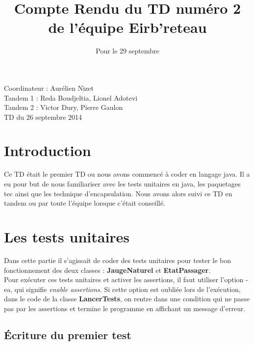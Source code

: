 \documentclass[a4paper,11pts]{article}
\begin{document}
\title{Compte Rendu du TD numéro 2 de l'équipe Eirb'reteau}
\date{Pour le 29 septembre}
\maketitle

\begin{center}
  Coordinateur : Aurélien Nizet\\
  Tandem 1 : Reda Boudjeltia, Lionel Adotevi\\
  Tandem 2 : Victor Dury, Pierre Gaulon\\
  TD du 26 septembre 2014
\end{center}
\maketitle

\section{Introduction}

Ce TD était le premier TD ou nous avons commencé à coder en langage java. Il a eu pour but de nous familiariser avec les tests unitaires en java, les paquetages tec ainsi que les technique d'encapsulation. Nous avons alors suivi ce TD en tandem ou par toute l'équipe lorsque c'était conseillé.

\section{Les tests unitaires}

Dans cette partie il s'agissait de coder des tests unitaires pour tester le bon fonctionnement des deux classes : \textbf{JaugeNaturel} et \textbf{EtatPassager}.
\\
Pour exécuter ces tests unitaires et activer les assertions, il faut utiliser l'option -ea, qui signifie \textit{enable assertions}. Si cette option est oubliée lors de l'exécution, dans le code de la classe \textbf{LancerTests}, on rentre dans une condition qui ne passe pas par les assertions et termine le programme en affichant un message d'erreur.
\\

\subsection{Écriture du premier test}
\end{document}
